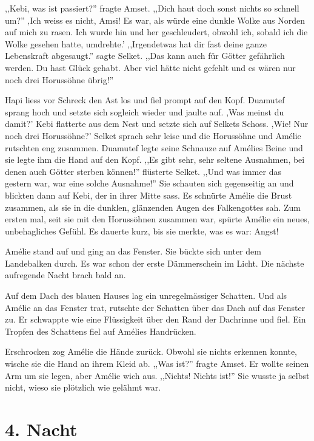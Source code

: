 \documentclass[11pt,titlepage,a5paper]{book}
\begin{document}
,,Kebi, was ist passiert?'' fragte Amset. ,,Dich haut doch sonst nichts so schnell um?'' ,Ich weiss es nicht, Amsi! Es war, als würde eine dunkle Wolke aus Norden auf mich zu rasen. Ich wurde hin und her geschleudert, obwohl ich, sobald ich die Wolke gesehen hatte, umdrehte.' ,,Irgendetwas hat dir fast deine ganze Lebenskraft abgesaugt.'' sagte Selket. ,,Das kann auch für Götter gefährlich werden. Du hast Glück gehabt. Aber viel hätte nicht gefehlt und es wären nur noch drei Horussöhne übrig!'' 

Hapi liess vor Schreck den Ast los und fiel prompt auf den Kopf. Duamutef sprang hoch und setzte sich sogleich wieder und jaulte auf. ,Was meinst du damit?' Kebi flatterte aus dem Nest und setzte sich auf Selkets Schoss. ,Wie! Nur noch drei Horussöhne?' Selket sprach sehr leise und die Horussöhne und Amélie rutschten eng zusammen. Duamutef legte seine Schnauze auf Amélies Beine und sie legte ihm die Hand auf den Kopf. ,,Es gibt sehr, sehr seltene Ausnahmen, bei denen auch Götter sterben können!'' flüsterte Selket. ,,Und was immer das gestern war, war eine solche Ausnahme!'' Sie schauten sich gegenseitig an und blickten dann auf Kebi, der in ihrer Mitte sass. Es schnürte Amélie die Brust zusammen, als sie in die dunklen, glänzenden Augen des Falkengottes sah. Zum ersten mal, seit sie mit den Horussöhnen zusammen war, spürte Amélie ein neues, unbehagliches Gefühl. Es dauerte kurz, bis sie merkte, was es war: Angst!

Amélie stand auf und ging an das Fenster. Sie bückte sich unter dem Landebalken durch. Es war schon der erste Dämmerschein im Licht. Die nächste aufregende Nacht brach bald an. 

Auf dem Dach des blauen Hauses lag ein unregelmässiger Schatten. Und als Amélie an das Fenster trat, rutschte der Schatten über das Dach auf das Fenster zu. Er schwappte wie eine Flüssigkeit über den Rand der Dachrinne und fiel. Ein Tropfen des Schattens fiel auf Amélies Handrücken.

Erschrocken zog Amélie die Hände zurück. Obwohl sie nichts erkennen konnte, wische sie die Hand an ihrem Kleid ab. ,,Was ist?'' fragte Amset. Er wollte seinen Arm um sie legen, aber Amélie wich aus. ,,Nichts! Nichts ist!'' Sie wusste ja selbst nicht, wieso sie plötzlich wie gelähmt war.

\chapter*{4. Nacht}
\end{document}
